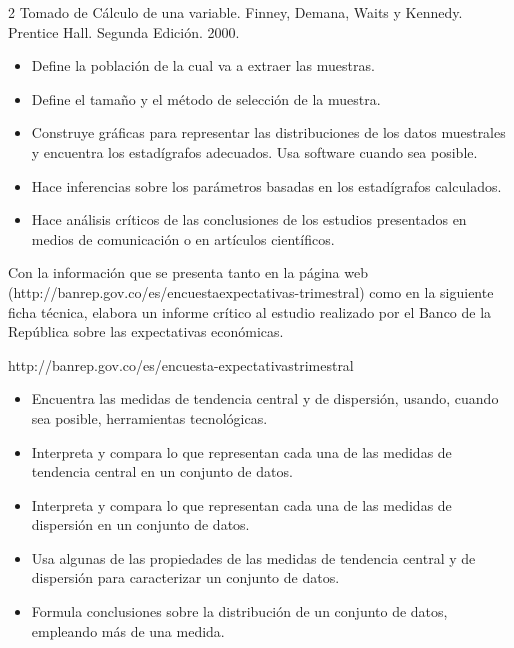 
2 Tomado de Cálculo de una variable. Finney, Demana, Waits y Kennedy. Prentice Hall. Segunda Edición. 2000.


\evidencias

\begin{itemize}
  \item Define la población de la cual va a extraer las muestras.
  \item Define el tamaño y el método de selección de la muestra.
  \item Construye gráficas para representar las distribuciones de los datos muestrales y encuentra los estadígrafos adecuados. Usa software cuando sea posible.
  \item Hace inferencias sobre los parámetros basadas en los estadígrafos calculados.
  \item Hace análisis críticos de las conclusiones de los estudios presentados en medios de comunicación o en artículos científicos.
\end{itemize}

\ejemplo

Con la información que se presenta tanto en la página web (http://banrep.gov.co/es/encuestaexpectativas-trimestral) como en la siguiente ficha técnica, elabora un informe crítico al estudio realizado por el Banco de la República sobre las expectativas económicas.

http://banrep.gov.co/es/encuesta-expectativastrimestral


\evidencias

\begin{itemize}
  \item Encuentra las medidas de tendencia central y de dispersión, usando, cuando sea posible, herramientas tecnológicas.
  \item Interpreta y compara lo que representan cada una de las medidas de tendencia central en un conjunto de datos.
  \item Interpreta y compara lo que representan cada una de las medidas de dispersión en un conjunto de datos.
  \item Usa algunas de las propiedades de las medidas de tendencia central y de dispersión para caracterizar un conjunto de datos.
  \item Formula conclusiones sobre la distribución de un conjunto de datos, empleando más de una medida.
\end{itemize}

